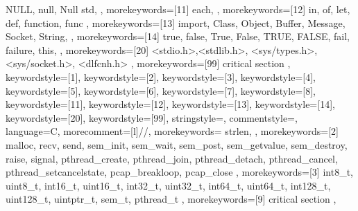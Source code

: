 {{		NULL, null, Null
		std,
	},%
	morekeywords=[11]{%
		each,
	},%
	morekeywords=[12]{%
		in, of, let, def,
		function, func
	},%
	morekeywords=[13]{%
		import,
		Class, Object,
		Buffer, Message,
		Socket, String,
	},%
	morekeywords=[14]{%
		true, false, True, False, TRUE, FALSE,
		fail, failure,
		this,
	},%
	morekeywords=[20]{%
		<stdio.h>,<stdlib.h>,
		<sys/types.h>,<sys/socket.h>,
		<dlfcnh.h>
	},%
	morekeywords=[99]{%
		critical section
	},%
	keywordstyle=[1]\lstCFontBasic,%
	keywordstyle=[2]\lstCFontPredefLib,%
	keywordstyle=[3]\lstCFontFuncCall,%
	keywordstyle=[4]\lstCFontType,%
	keywordstyle=[5]\lstCFontCollection,%
	keywordstyle=[6]\lstCFontVar,%
	keywordstyle=[7]\lstCFontSpecialBasic,%
	keywordstyle=[8]\lstCFontSpecialLib,%
	keywordstyle=[11]\lstCFontForeignA,%
	keywordstyle=[12]\lstCFontForeignB,%
	keywordstyle=[13]\lstCFontObject,%
	keywordstyle=[14]\lstCFontMoreKey,%
	keywordstyle=[20]\lstCFontString,%
	keywordstyle=[99]\lstCFontHighRed,%
	stringstyle=\lstCFontString,%
	commentstyle=\lstCFontComment,%
}%
%
{%
	language=C,%
	morecomment=[l]{//},%
	morekeywords={%
		strlen,
	},%
	morekeywords=[2]{%
		malloc,
		recv,
		send,
		sem_init,
		sem_wait,
		sem_post,
		sem_getvalue,
		sem_destroy,
		raise,
		signal,
		pthread_create,
		pthread_join,
		pthread_detach,
		pthread_cancel,
		pthread_setcancelstate,
		pcap_breakloop,
		pcap_close
	},%
	morekeywords=[3]{%
		int8_t,
		uint8_t,
		int16_t,
		uint16_t,
		int32_t,
		uint32_t,
		int64_t,
		uint64_t,
		int128_t,
		uint128_t,
		uintptr_t,
		sem_t,
		pthread_t
	},%
	morekeywords=[9]{%
		critical section
	},%
}%
